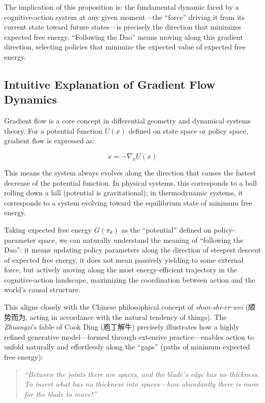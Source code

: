 \documentclass[11pt,a4paper]{article}
\begin{document}
The implication of this proposition is: the fundamental dynamic faced by a cognitive-action system at any given moment---the ``force'' driving it from its current state toward future states---is precisely the direction that minimizes expected free energy. ``Following the Dao'' means moving along this gradient direction, selecting policies that minimize the expected value of expected free energy.

\subsection{Intuitive Explanation of Gradient Flow Dynamics}

Gradient flow is a core concept in differential geometry and dynamical systems theory. For a potential function $U(x)$ defined on state space or policy space, gradient flow is expressed as:

\begin{equation}
\dot{x} = -\nabla_x U(x)
\label{eq:gradient_flow}
\end{equation}

This means the system always evolves along the direction that causes the fastest decrease of the potential function. In physical systems, this corresponds to a ball rolling down a hill (potential is gravitational); in thermodynamic systems, it corresponds to a system evolving toward the equilibrium state of minimum free energy.

Taking expected free energy $G(\pi_\theta)$ as the ``potential'' defined on policy-parameter space, we can naturally understand the meaning of ``following the Dao'': it means updating policy parameters along the direction of steepest descent of expected free energy. it does not mean passively yielding to some external force, but actively moving along the most energy-efficient trajectory in the cognitive-action landscape, maximizing the coordination between action and the world's causal structure.

This aligns closely with the Chinese philosophical concept of \textit{shun-shi-er-wei} (顺势而为, acting in accordance with the natural tendency of things). The \textit{Zhuangzi}'s fable of Cook Ding (庖丁解牛) precisely illustrates how a highly refined generative model---formed through extensive practice---enables action to unfold naturally and effortlessly along the ``gaps'' (paths of minimum expected free energy):

\begin{quote}
\textit{``Between the joints there are spaces, and the blade's edge has no thickness. To insert what has no thickness into spaces---how abundantly there is room for the blade to move!''}
\end{quote}
\end{document}

